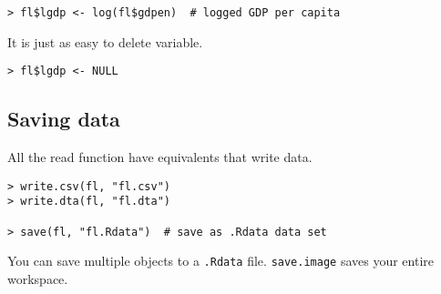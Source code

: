 \begin{lstlisting}
> fl$lgdp <- log(fl$gdpen)  # logged GDP per capita
\end{lstlisting}

It is just as easy to delete variable.

\begin{lstlisting}
> fl$lgdp <- NULL
\end{lstlisting}

\subsection{Saving data}

All the read function have equivalents that write data.

\begin{lstlisting}
> write.csv(fl, "fl.csv")
> write.dta(fl, "fl.dta")

> save(fl, "fl.Rdata")  # save as .Rdata data set
\end{lstlisting}

You can save multiple objects to a \texttt{.Rdata} file. \texttt{save.image} saves your entire workspace.